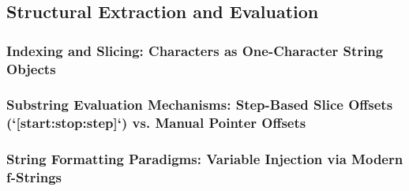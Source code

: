 \subsection{Structural Extraction and Evaluation}
\subsubsection{Indexing and Slicing: Characters as One-Character String Objects}
\subsubsection{Substring Evaluation Mechanisms: Step-Based Slice Offsets (`[start:stop:step]`) vs. Manual Pointer Offsets}
\subsubsection{String Formatting Paradigms: Variable Injection via Modern f-Strings}
